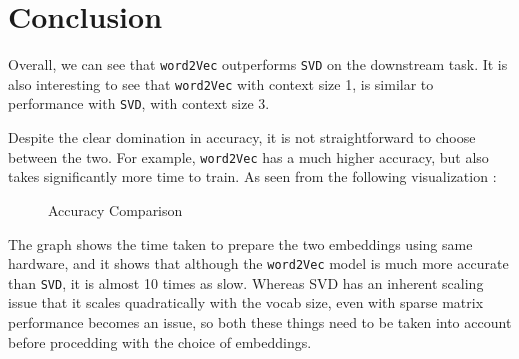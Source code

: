 \section*{Conclusion}
\label{sec:conclusion}

Overall, we can see that \verb|word2Vec| outperforms \verb|SVD| on the downstream task. It is also interesting to see that \verb|word2Vec| with context size 1, is similar to performance with \verb|SVD|, with context size 3. 

Despite the clear domination in accuracy, it is not straightforward to choose between the two. For example, \verb|word2Vec| has a much higher accuracy, but also takes significantly more time to train. As seen from the following visualization :

\begin{figure}[H]
    \centering
    
    \caption{Accuracy Comparison}
\end{figure}

The graph shows the time taken to prepare the two embeddings using same hardware, and it shows that although the \verb|word2Vec| model is much more accurate than \verb|SVD|, it is almost 10 times as slow. Whereas SVD has an inherent scaling issue that it scales quadratically with the vocab size, even with sparse matrix performance becomes an issue, so both these things need to be taken into account before procedding with the choice of embeddings.
